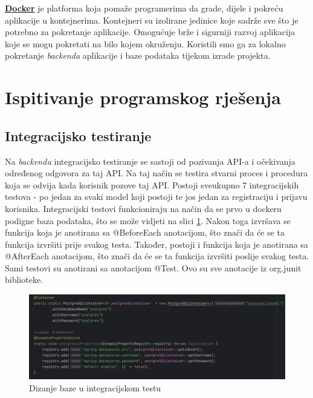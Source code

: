			 \textbf{\href{https://www.docker.com/}{Docker}} je platforma koja pomaže programerima da grade, dijele i pokreću aplikacije
			 u kontejnerima. Kontejneri su izolirane jedinice koje sadrže sve što je potrebno za pokretanje aplikacije. Omogućuje brže
			 i sigurniji razvoj aplikacija koje se mogu pokretati na bilo kojem okruženju. Koristili smo ga za lokalno pokretanje
			 \textit{backenda} aplikacije i baze podataka tijekom izrade projekta. 

			\eject 
		
	
		\section{Ispitivanje programskog rješenja}
			
			\subsection{Integracijsko testiranje}

			Na \textit{backendu} integracijsko testiranje se sastoji od pozivanja API-a i očekivanja određenog odgovora za taj API.
            Na taj način se testira stvarni proces i procedura koja se odvija kada korisnik pozove taj API.
            Postoji sveukupno 7 integracijskih testova - po jedan za svaki model koji postoji te jos jedan za registraciju i prijavu korisnika.
            Integracijski testovi funkcioniraju na način da se prvo u dockeru podigne baza podataka, što se može vidjeti na slici \ref{fig:IT_docker}.
            Nakon toga izvršava se funkcija koja je anotirana sa @BeforeEach anotacijom, što znači da će se ta funkcija izvršiti prije svakog testa.
            Također, postoji i funkcija koja je anotirana sa @AfterEach anotacijom, što znači da će se ta funkcija izvršiti poslije svakog testa.
            Sami testovi su anotirani sa anotacijom @Test.
			Ovo su sve anotacije iz org.junit biblioteke.
            \begin{figure}[H]
                \includegraphics[scale=0.60]{slike/IT_containerized_docker.png}
                \centering
                \caption{Dizanje baze u integracijskom testu}
                \label{fig:IT_docker}
            \end{figure}

